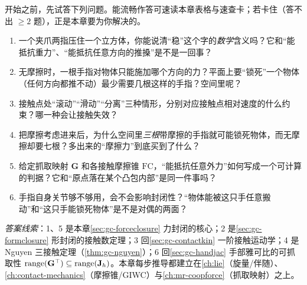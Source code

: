 \begin{practice}[前置自测]
开始之前，先试答下列问题。能流畅作答可速读本章表格与速查卡；若卡住（答不出 $\ge 2$ 题），正是本章要为你解决的。
\begin{enumerate}
  \item 一个夹爪两指压住一个立方体，你能说清“稳”这个字的\emph{数学}含义吗？它和“能抵抗重力”、“能抵抗任意方向的推搡”是不是一回事？
  \item 无摩擦时，一根手指对物体只能施加哪个方向的力？平面上要“锁死”一个物体（任何方向都推不动）最少需要几根这样的手指？空间里呢？
  \item 接触点处“滚动”“滑动”“分离”三种情形，分别对应接触点相对速度的什么约束？哪一种会让接触失效？
  \item 把摩擦考虑进来后，为什么空间里\emph{三根}带摩擦的手指就可能锁死物体，而无摩擦却要七根？多出来的“摩擦力”到底买到了什么？
  \item 给定抓取映射 $\mathbf{G}$ 和各接触摩擦锥 $\mathrm{FC}$，“能抵抗任意外力”如何写成一个可计算的判据？它和“原点落在某个凸包内部”是同一件事吗？
  \item 手指自身关节够不够用，会不会影响封闭性？“物体能被这只手任意搬动”和“这只手能锁死物体”是不是对偶的两面？
\end{enumerate}
\noindent\emph{答案线索}：1、5 是本章\cref{sec:gc-forceclosure} 力封闭的核心；2 是\cref{sec:gc-formclosure} 形封闭的接触数定理；3 回\cref{sec:gc-contactkin} 一阶接触运动学；4 是 Nguyen 三接触定理（\cref{thm:gc-nguyen}）；6 回\cref{sec:gc-handjac} 手部雅可比的可抓取性 $\operatorname{range}(\mathbf{G}^\top)\subseteq\operatorname{range}(\mathbf{J}_h)$。本章每步推导都建立在\cref{ch:lie}（旋量/伴随）、\cref{ch:contact-mechanics}（摩擦锥/GIWC）与\cref{ch:mr-coopforce}（抓取映射）之上。
\end{practice}

